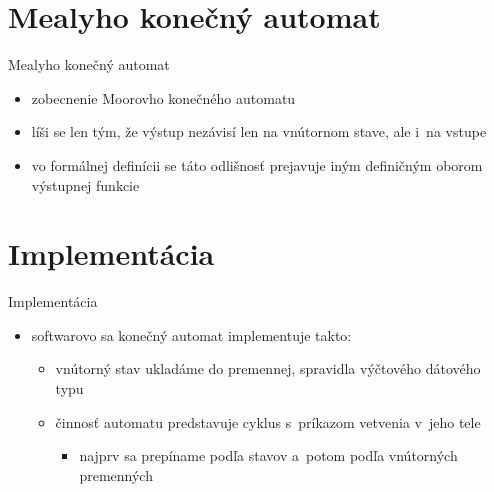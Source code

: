 \documentclass[hyperref={unicode}]{beamer}
\begin{document}
\section{Mealyho konečný automat}
\begin{block}{Mealyho konečný automat}
\transwipe
\begin{itemize}
\item zobecnenie Moorovho konečného automatu
\item líši se len tým, že výstup nezávisí len na vnútornom stave, ale i~na vstupe
\item vo formálnej definícii se táto odlišnosť prejavuje iným definičným oborom výstupnej funkcie
\end{itemize}
\end{block}
\begin{figure}[h]
\centering
{}
\end{figure}


\section{Implementácia}
\begin{frame}{Implementácia}
\transwipe
\begin{itemize}
\item softwarovo sa konečný automat implementuje takto:
\begin{itemize}
\item vnútorný stav ukladáme do premennej, spravidla výčtového dátového typu
\item činnosť automatu predstavuje cyklus s~príkazom vetvenia v~jeho tele
\begin{itemize}
\item najprv sa prepíname podľa stavov a~potom podľa vnútorných premenných
\end{itemize}
\end{itemize}
\end{itemize}
\end{frame}
\end{document}
